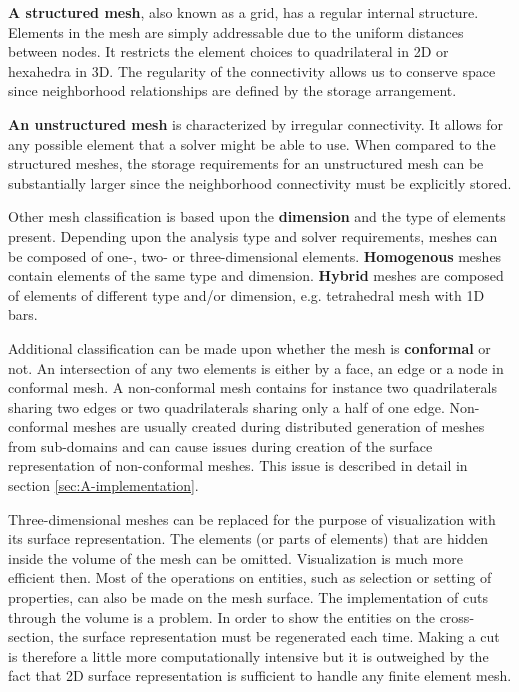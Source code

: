 \textbf{A structured mesh}, also known as a grid, has a regular internal structure. Elements in the mesh are simply addressable due to the uniform distances between nodes. It restricts the element choices to quadrilateral in 2D or hexahedra in 3D. The regularity of the connectivity allows us to conserve space since neighborhood relationships are defined by the storage arrangement.

\textbf{An unstructured mesh} is characterized by irregular connectivity. It allows for any possible element that a solver might be able to use. When compared to the structured meshes, the storage requirements for an unstructured mesh can be substantially larger since the neighborhood connectivity must be explicitly stored.

Other mesh classification is based upon the \textbf{dimension} and the type of elements present. Depending upon the analysis type and solver requirements, meshes can be composed of one-, two- or three-dimensional elements. \textbf{Homogenous} meshes contain elements of the same type and dimension. \textbf{Hybrid} meshes are composed of elements of different type and/or dimension, e.g. tetrahedral mesh with 1D bars.

Additional classification can be made upon whether the mesh is \textbf{conformal} or not. An intersection of any two elements is either by a face, an edge or a node in conformal mesh. A non-conformal mesh contains for instance two quadrilaterals sharing two edges or two quadrilaterals sharing only a half of one edge. Non-conformal meshes are usually created during distributed generation of meshes from sub-domains and can cause issues during creation of the surface representation of non-conformal meshes. This issue is described in detail in section \ref{sec:A-implementation}.

Three-dimensional meshes can be replaced for the purpose of visualization with its surface representation. The elements (or parts of elements) that are hidden inside the volume of the mesh can be omitted. Visualization is much more efficient then. Most of the operations on entities, such as selection or setting of properties, can also be made on the mesh surface. The implementation of cuts through the volume is a problem. In order to show the entities on the cross-section, the surface representation must be regenerated each time. Making a cut is therefore a little more computationally intensive but it is outweighed by the fact that 2D surface representation is sufficient to handle any finite element mesh.

